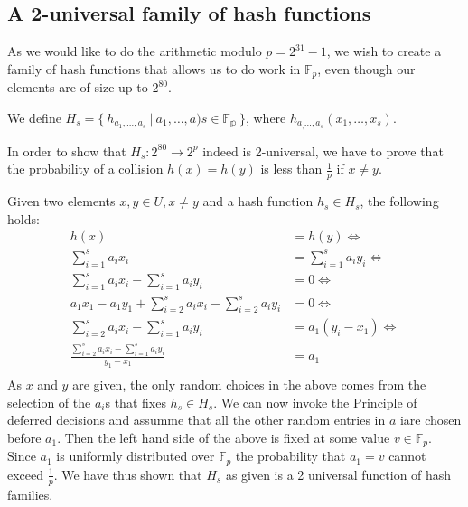 \documentclass[article,a4paper,oneside]{article}
\newcommand{\+}[1]{\ensuremath{\boldsymbol{#1}}}
\begin{document}
\subsection*{A 2-universal family of hash functions}
As we would like to do the arithmetic modulo $p = 2^{31}-1$, we wish to create a family of hash functions that allows us to do work in $\mathbb{F}_p$, even though our elements are of size up to $2^{80}$.

We define $H_s=\{\ h_{a_1,\ldots,a_s}\ | \ a_1,\ldots,a)s\in \mathbb{F_p}\ \}$,
where $h_{a_,\ldots,a_s}(x_1,\ldots,x_s)$.

In order to show that $H_s: 2^{80} \rightarrow 2^p$ indeed is 2-universal, we have to prove that the probability of a collision $h(x) = h(y)$ is less than $\frac{1}{p}$ if $x \neq y$.

Given two elements $x,y \in U, x \neq y$ and a hash function $h_s \in H_s$, the following holds:
\begin{align*}
h(x) &= h(y) \iff \\
\sum_{i=1}^{s}a_ix_i &= \sum_{i=1}^sa_iy_i \iff \\
\sum_{i=1}^{s}a_ix_i - \sum_{i=1}^sa_iy_i &= 0 \iff \\
a_1x_1 - a_1y_1 + \sum_{i=2}^{s}a_ix_i - \sum_{i=2}^sa_iy_i &= 0 \iff \\
\sum_{i=2}^{s}a_ix_i - \sum_{i=1}^sa_iy_i &= a_1(y_i-x_1) \iff \\
\frac{\sum_{i=2}^{s}a_ix_i - \sum_{i=1}^sa_iy_i}{y_1-x_1} &= a_1 \\
\end{align*}
As $x$ and $y$ are given, the only random choices in the above comes from the selection of the $a_i$s that fixes $h_s \in H_s$. We can now invoke the Principle of deferred decisions and assumme that all the other random entries in $a$ iare chosen before $a_1$. Then the left hand side of the above is fixed at some value $v \in \mathbb{F}_p$. Since $a_1$ is uniformly distributed over $\mathbb{F}_p$ the probability that $a_1 = v$ cannot exceed $\frac{1}{p}$. We have thus shown that $H_s$ as given is a 2 universal function of hash families.
\end{document}

